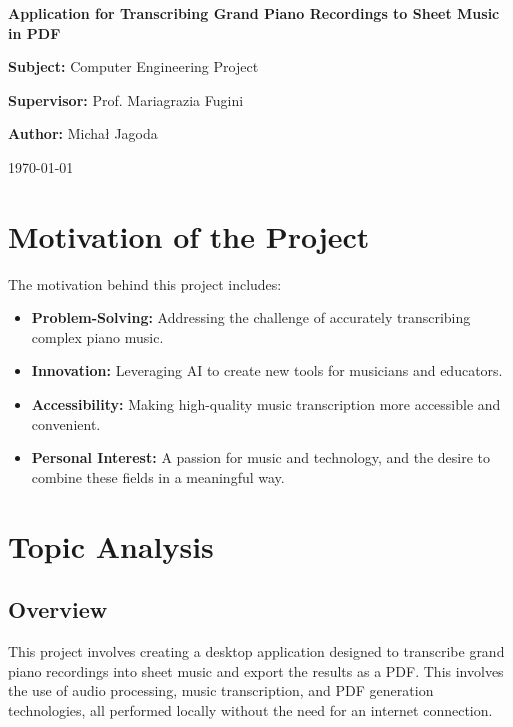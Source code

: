\documentclass{article}
\begin{document}
\begin{titlepage}
    \centering
    \vspace*{2cm} %
    {\Huge \bfseries Application for Transcribing Grand Piano Recordings to Sheet Music in PDF\par}
    \vspace{8cm}
    {\Large \textbf{Subject:} Computer Engineering Project\par}
    \vspace{0.5cm}
    {\Large \textbf{Supervisor:} Prof. Mariagrazia Fugini\par}
    \vspace{0.5cm}
    {\Large \textbf{Author:} Michał Jagoda\par}
    \vspace{0.5cm}
    {\Large \today\par}
    \vfill
\end{titlepage}

\clearpage %
\tableofcontents
\clearpage %

\section{Motivation of the Project}

The motivation behind this project includes:
\begin{itemize}
    \item \textbf{Problem-Solving:} Addressing the challenge of accurately transcribing complex piano music.
    \item \textbf{Innovation:} Leveraging AI to create new tools for musicians and educators.
    \item \textbf{Accessibility:} Making high-quality music transcription more accessible and convenient.
    \item \textbf{Personal Interest:} A passion for music and technology, and the desire to combine these fields in a meaningful way.
\end{itemize}


\section{Topic Analysis}

\subsection{Overview}
This project involves creating a desktop application designed to transcribe grand piano recordings into sheet music and export the results as a PDF. This involves the use of audio processing, music transcription, and PDF generation technologies, all performed locally without the need for an internet connection.
\end{document}
